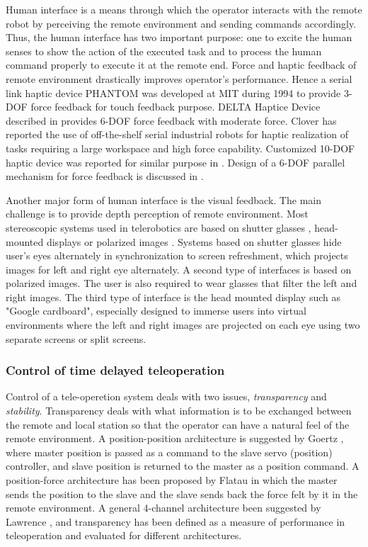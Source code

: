 Human interface is a means through which the operator interacts with the remote robot by perceiving the remote environment and sending commands accordingly. Thus, the human interface has two important purpose: one to excite the human senses to show the action of the executed task and to process the human command properly to execute it at the remote end.  Force and haptic feedback of remote environment drastically improves operator's performance. Hence a serial link haptic device PHANTOM \cite{massie1994phantom} was developed at MIT during 1994 to provide 3-DOF force feedback  for touch feedback purpose. DELTA Haptice Device described in \cite{grange2001overview} provides 6-DOF force feedback with moderate force. Clover \cite{clover1997dynamic} has reported  the use of off-the-shelf serial industrial robots for haptic realization of tasks requiring a large workspace and high force capability. Customized 10-DOF  haptic device was reported  for similar purpose in \cite{ueberle2004vishard10}. Design  of a 6-DOF parallel mechanism for force feedback is discussed in \cite{yoon2001design}.

Another major form of human interface is the visual feedback. The main challenge is to provide depth perception of remote environment. Most stereoscopic systems used in telerobotics are based on shutter glasses \cite{aracil1997telerobotic,matthies1992stereo}, head-mounted displays \cite{matthies1992stereo} or polarized images \cite{hirzinger1994robots}. Systems based on shutter glasses hide user's eyes alternately in synchronization to screen refreshment, which projects images for left and right eye alternately. A second type of interfaces is based on polarized images. The user is also required to wear glasses that filter the left and right images. The third type of interface is  the head mounted display such as "Google cardboard",  especially designed to immerse users into virtual environments where the left and right images are projected on each eye using two separate screens or split screens.

\subsubsection{Control of time delayed teleoperation}
Control of a tele-operetion system deals with two issues, \textit{transparency} and \textit{stability}. Transparency deals with what information is to be exchanged between the remote and local station so that the operator can have a natural feel of the remote environment. A position-position architecture is suggested by  Goertz \cite{goertz1961anl}, where  master position is passed as a command to the slave servo (position) controller, and slave position is returned to the master as a position command. A position-force architecture has been proposed by Flatau \cite{flatau1977sm} in which the master sends the position to the slave and the slave sends back the force felt by it in the remote environment. A general 4-channel architecture been suggested by Lawrence \cite{lawrence1993stability}, and transparency has been defined  as a measure of performance in teleoperation and evaluated for different architectures.

